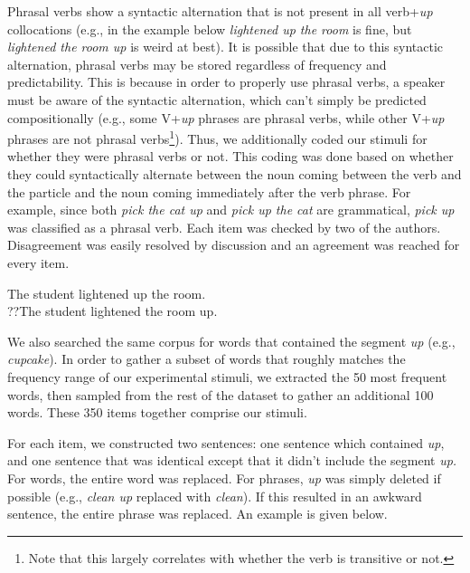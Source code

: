 \documentclass[
  12pt,
  letterpaper,
]{scrreport}
\begin{document}
Phrasal verbs show a syntactic alternation that is not present in all
verb+\emph{up} collocations (e.g., in the example below \emph{lightened
up the room} is fine, but \emph{lightened the room up} is weird at
best). It is possible that due to this syntactic alternation, phrasal
verbs may be stored regardless of frequency and predictability. This is
because in order to properly use phrasal verbs, a speaker must be aware
of the syntactic alternation, which can't simply be predicted
compositionally (e.g., some V+\emph{up} phrases are phrasal verbs, while
other V+\emph{up} phrases are not phrasal verbs\footnote{Note that this
  largely correlates with whether the verb is transitive or not.}).
Thus, we additionally coded our stimuli for whether they were phrasal
verbs or not. This coding was done based on whether they could
syntactically alternate between the noun coming between the verb and the
particle and the noun coming immediately after the verb phrase. For
example, since both \emph{pick the cat up} and \emph{pick up the cat}
are grammatical, \emph{pick up} was classified as a phrasal verb. Each
item was checked by two of the authors. Disagreement was easily resolved
by discussion and an agreement was reached for every item.

\begin{exe} 
\ex
  \begin{singlespace}
  \begin{xlist}
    \ex The student lightened up the room. \\
    \ex ??The student lightened the room up. \\
  \end{xlist}
  \end{singlespace}
\end{exe}

We also searched the same corpus for words that contained the segment
\emph{up} (e.g., \emph{cupcake}). In order to gather a subset of words
that roughly matches the frequency range of our experimental stimuli, we
extracted the 50 most frequent words, then sampled from the rest of the
dataset to gather an additional 100 words. These 350 items together
comprise our stimuli.

For each item, we constructed two sentences: one sentence which
contained \emph{up}, and one sentence that was identical except that it
didn't include the segment \emph{up.} For words, the entire word was
replaced. For phrases, \emph{up} was simply deleted if possible (e.g.,
\emph{clean up} replaced with \emph{clean}). If this resulted in an
awkward sentence, the entire phrase was replaced. An example is given
below.
\end{document}
